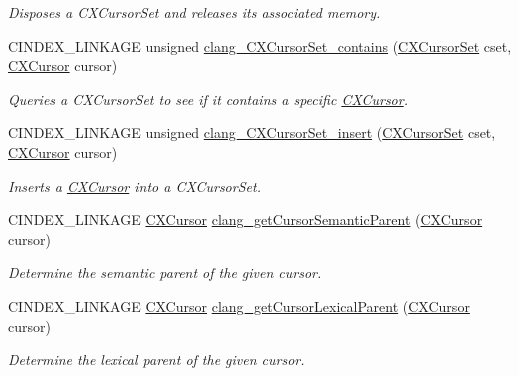 \begin{DoxyCompactItemize}
\begin{DoxyCompactList}\small\item\em Disposes a C\+X\+Cursor\+Set and releases its associated memory. \end{DoxyCompactList}\item 
C\+I\+N\+D\+E\+X\+\_\+\+L\+I\+N\+K\+A\+GE unsigned \hyperlink{group__CINDEX__CURSOR__MANIP_ga518db5daf2ca251e4ff983d9f4f7d75d}{clang\+\_\+\+C\+X\+Cursor\+Set\+\_\+contains} (\hyperlink{group__CINDEX__CURSOR__MANIP_gacca741976831fc313f80970cbf88307d}{C\+X\+Cursor\+Set} cset, \hyperlink{structCXCursor}{C\+X\+Cursor} cursor)
\begin{DoxyCompactList}\small\item\em Queries a C\+X\+Cursor\+Set to see if it contains a specific \hyperlink{structCXCursor}{C\+X\+Cursor}. \end{DoxyCompactList}\item 
C\+I\+N\+D\+E\+X\+\_\+\+L\+I\+N\+K\+A\+GE unsigned \hyperlink{group__CINDEX__CURSOR__MANIP_ga172e5a92c77da9609ad80baf08751dd1}{clang\+\_\+\+C\+X\+Cursor\+Set\+\_\+insert} (\hyperlink{group__CINDEX__CURSOR__MANIP_gacca741976831fc313f80970cbf88307d}{C\+X\+Cursor\+Set} cset, \hyperlink{structCXCursor}{C\+X\+Cursor} cursor)
\begin{DoxyCompactList}\small\item\em Inserts a \hyperlink{structCXCursor}{C\+X\+Cursor} into a C\+X\+Cursor\+Set. \end{DoxyCompactList}\item 
C\+I\+N\+D\+E\+X\+\_\+\+L\+I\+N\+K\+A\+GE \hyperlink{structCXCursor}{C\+X\+Cursor} \hyperlink{group__CINDEX__CURSOR__MANIP_gabc327b200d46781cf30cb84d4af3c877}{clang\+\_\+get\+Cursor\+Semantic\+Parent} (\hyperlink{structCXCursor}{C\+X\+Cursor} cursor)
\begin{DoxyCompactList}\small\item\em Determine the semantic parent of the given cursor. \end{DoxyCompactList}\item 
C\+I\+N\+D\+E\+X\+\_\+\+L\+I\+N\+K\+A\+GE \hyperlink{structCXCursor}{C\+X\+Cursor} \hyperlink{group__CINDEX__CURSOR__MANIP_gace7a423874d72b3fdc71d6b0f31830dd}{clang\+\_\+get\+Cursor\+Lexical\+Parent} (\hyperlink{structCXCursor}{C\+X\+Cursor} cursor)
\begin{DoxyCompactList}\small\item\em Determine the lexical parent of the given cursor. \end{DoxyCompactList}\item 

\end{DoxyCompactItemize}

